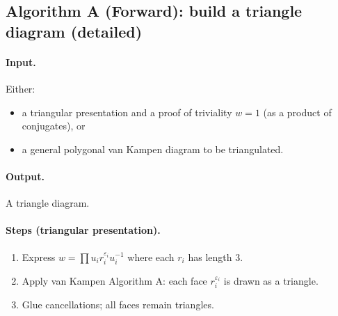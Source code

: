 \documentclass[11pt]{article}
\theoremstyle{definition}
\theoremstyle{plain}
\theoremstyle{remark}
\begin{document}
\subsection*{Algorithm A (Forward): build a triangle diagram (detailed)}\cite{hatcher2002}
\paragraph{Input.}
Either:
\begin{itemize}[leftmargin=2em]
\item a triangular presentation and a proof of triviality $w=1$ (as a product of conjugates), or
\item a general polygonal van Kampen diagram to be triangulated.
\end{itemize}

\paragraph{Output.}
A triangle diagram.

\paragraph{Steps (triangular presentation).}
\begin{enumerate}[leftmargin=2.2em]
\item Express $w=\prod u_i r_i^{\varepsilon_i}u_i^{-1}$ where each $r_i$ has length $3$.
\item Apply van Kampen Algorithm A: each face $r_i^{\varepsilon_i}$ is drawn as a triangle.
\item Glue cancellations; all faces remain triangles.
\end{enumerate}
\end{document}
